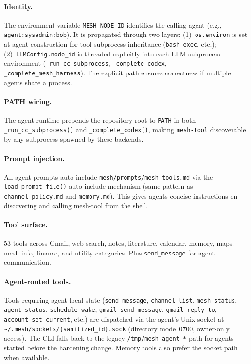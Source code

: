 \documentclass[11pt,letterpaper]{report}
\newcommand{\code}[1]{\texttt{#1}}
\begin{document}
\paragraph{Identity.}
The environment variable \code{MESH\_NODE\_ID} identifies the calling
agent (e.g., \code{agent:sysadmin:bob}). It is propagated through two
layers: (1)~\code{os.environ} is set at agent construction for tool
subprocess inheritance (\code{bash\_exec}, etc.); (2)~\code{LLMConfig.node\_id}
is threaded explicitly into each LLM subprocess environment
(\code{\_run\_cc\_subprocess}, \code{\_complete\_codex},
\code{\_complete\_mesh\_harness}). The explicit path ensures correctness
if multiple agents share a process.

\paragraph{PATH wiring.}
The agent runtime prepends the repository root to \code{PATH} in both
\code{\_run\_cc\_subprocess()} and \code{\_complete\_codex()}, making
\code{mesh-tool} discoverable by any subprocess spawned by these
backends.

\paragraph{Prompt injection.}
All agent prompts auto-include \code{mesh/prompts/mesh\_tools.md} via
the \code{load\_prompt\_file()} auto-include mechanism (same pattern as
\code{channel\_policy.md} and \code{memory.md}). This gives agents
concise instructions on discovering and calling mesh-tool from the shell.

\paragraph{Tool surface.}
53 tools across Gmail, web search, notes, literature,
calendar, memory, maps, mesh info, finance, and utility categories.
Plus \code{send\_message} for agent communication.

\paragraph{Agent-routed tools.}
Tools requiring agent-local state (\code{send\_message},
\code{channel\_list}, \code{mesh\_status}, \code{agent\_status},
\code{schedule\_wake}, \code{gmail\_send\_message},
\code{gmail\_reply\_to}, \code{account\_set\_current},
etc.) are dispatched via the agent's Unix socket
at \code{\textasciitilde/.mesh/sockets/\{sanitized\_id\}.sock}
(directory mode~0700, owner-only access). The CLI falls back to the
legacy \code{/tmp/mesh\_agent\_*} path for agents started before the
hardening change. Memory tools also prefer the socket path when
available.
\end{document}
